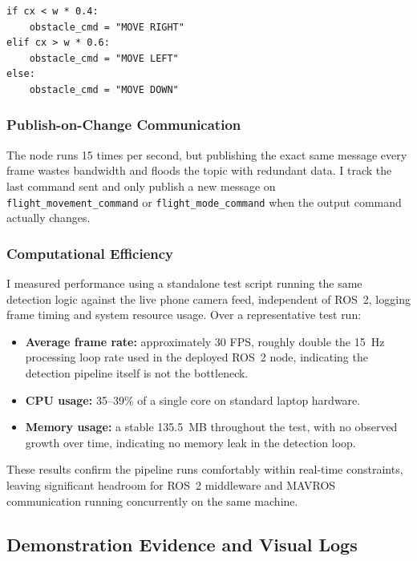 \documentclass[12pt,a4paper]{article}
\begin{document}
\begin{lstlisting}[style=pythonstyle, caption={Deciding dodge directions using screen position.}]
if cx < w * 0.4:
    obstacle_cmd = "MOVE RIGHT"
elif cx > w * 0.6:
    obstacle_cmd = "MOVE LEFT"
else:
    obstacle_cmd = "MOVE DOWN"
\end{lstlisting}

\subsubsection{Publish-on-Change Communication}
The node runs 15 times per second, but publishing the exact same
message every frame wastes bandwidth and floods the topic with
redundant data. I track the last command sent and only publish a new
message on \texttt{flight\_movement\_command} or
\texttt{flight\_mode\_command} when the output command actually changes.

\subsubsection{Computational Efficiency}
I measured performance using a standalone test script running the same
detection logic against the live phone camera feed, independent of
ROS~2, logging frame timing and system resource usage. Over a
representative test run:

\begin{itemize}
    \item \textbf{Average frame rate:} approximately 30 FPS, roughly
    double the 15~Hz processing loop rate used in the deployed ROS~2
    node, indicating the detection pipeline itself is not the
    bottleneck.
    \item \textbf{CPU usage:} 35--39\% of a single core on standard
    laptop hardware.
    \item \textbf{Memory usage:} a stable 135.5~MB throughout the test,
    with no observed growth over time, indicating no memory leak in the
    detection loop.
\end{itemize}

These results confirm the pipeline runs comfortably within real-time
constraints, leaving significant headroom for ROS~2 middleware and
MAVROS communication running concurrently on the same machine.

\subsection{Demonstration Evidence and Visual Logs}
\end{document}
